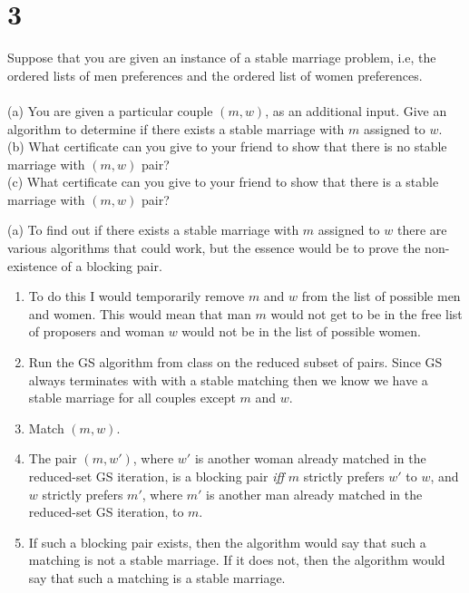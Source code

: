 \section*{3}
Suppose that you are given an instance of a stable marriage problem, i.e, the ordered lists of men preferences and the ordered list of women preferences.\\\\ (a) You are given a particular couple $(m, w)$, as an additional input. Give an algorithm to determine if there exists a stable marriage with $m$ assigned to $w$.\\
(b) What certificate can you give to your friend to show that there is no stable marriage with $(m, w)$ pair?\\
(c) What certificate can you give to your friend to show that there is a stable marriage with $(m, w)$ pair?
\probLine

\noindent(a) To find out if there exists a stable marriage with $m$ assigned to $w$ there are various algorithms that could work, but the essence would be to prove the non-existence of a blocking pair. 
\begin{enumerate}
    \item To do this I would temporarily remove $m$ and $w$ from the list of possible men and women. This would mean that man $m$ would not get to be in the free list of proposers and woman $w$ would not be in the list of possible women.
    \item Run the GS algorithm from class on the reduced subset of pairs. Since GS always terminates with with a stable matching then we know we have a stable marriage for all couples except $m$ and $w$. 
    \item Match $(m,w)$.
    \item The pair $(m, w')$, where $w'$ is another woman already matched in the reduced-set GS iteration, is a blocking pair \textit{iff} $m$ strictly prefers $w'$ to $w$, and $w$ strictly prefers $m'$, where $m'$ is another man already matched in the reduced-set GS iteration, to $m$.
    \item If such a blocking pair exists, then the algorithm would say that such a matching is not a stable marriage. If it does not, then the algorithm would say that such a matching is a stable marriage.
\end{enumerate}

